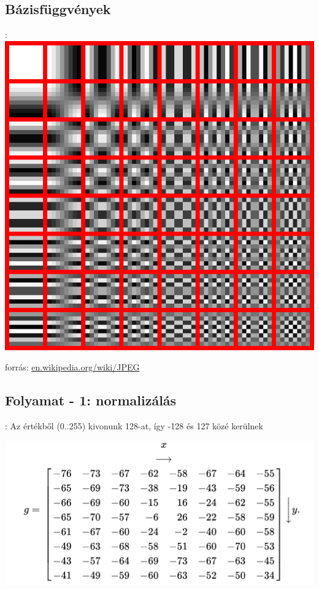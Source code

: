 \documentclass{beamer}
\begin{document}
\subsection{Bázisfüggvények}
\begin{frame}{\secname : \subsecname}
\centering
\includegraphics[scale=0.3]{figures/Dctjpeg.png}

\begin{footnotesize}
    forrás: \url{en.wikipedia.org/wiki/JPEG}
\end{footnotesize}

\end{frame}

\subsection{Folyamat - 1: normalizálás} 
\begin{frame}{\secname : \subsecname}
\centering
Az értékből (0..255) kivonunk 128-at, így -128 és 127 közé kerülnek

\includegraphics[scale=0.4]{figures/DCT_centered.png}
\end{frame}
\end{document}
